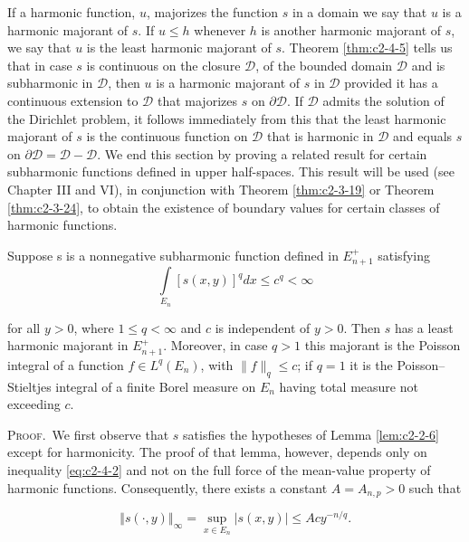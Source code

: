 If a harmonic function, $u$, majorizes the function $s$ in a domain we say that $u$ is a harmonic majorant of $s$. If $u \leq h$ whenever $h$ is another harmonic majorant of $s$, we say that $u$ is the least harmonic majorant of $s$. Theorem \ref{thm:c2-4-5} tells us that in case $s$ is continuous on the closure $\mathcal{D}$, of the bounded domain $\mathcal{D}$ and is subharmonic in $\mathcal{D}$, then $u$ is a harmonic majorant of $s$ in $\mathcal{D}$ provided it has a continuous extension to $\mathcal{D}$ that majorizes $s$ on $\partial\mathcal{D}$. If $\mathcal{D}$ admits the solution of the Dirichlet problem, it follows immediately from this that the least harmonic majorant of $s$ is the continuous function on $\mathcal{D}$ that is harmonic in $\mathcal{D}$ and equals $s$ on $\partial\mathcal{D} = \mathcal{D} - \mathcal{D}$. We end this section by proving a related result for certain subharmonic functions defined in upper half-spaces. This result will be used (see Chapter III and VI), in conjunction with Theorem \ref{thm:c2-3-19} or Theorem \ref{thm:c2-3-24}, to obtain the existence of boundary values for certain classes of harmonic functions.

\begin{theorem}
\label{thm:c2-4-6}
Suppose s is a nonnegative subharmonic function defined in $E_{n+1}^{+}$ satisfying
\begin{equation}\label{eq:c2-4-7}
\int\limits_{E_{n}}[s(x,y)]^{q} dx\leq c^{q}<\infty
\end{equation}

for all $y > 0$, where $1 \leq q < \infty$ and $c$ is independent of $y > 0$. Then $s$ has a least harmonic majorant in $E_{n+1}^{+}$. Moreover, in case $q > 1$ this majorant is the Poisson integral of a function $f \in L^{q}(E_{n})$, with $\|f\|_{q} \leq c$; if $q = 1$ it is the Poisson--Stieltjes integral of a finite Borel measure on $E_{n}$ having total measure not exceeding $c$.
\end{theorem}

\textsc{Proof.}\ We first observe that $s$ satisfies the hypotheses of Lemma \ref{lem:c2-2-6} except for harmonicity. The proof of that lemma, however, depends only on inequality \eqref{eq:c2-4-2} and not on the full force of the mean-value property of harmonic functions. Consequently, there exists a constant $A = A_{n,p} > 0$ such that

\begin{equation}\label{eq:c2-4-8}
\left\Vert s(\cdot,y)\right\Vert_{\infty}=\sup_{x\in E_{n}}\left\vert s(x,y)\right\vert\leq A c y^{-n/q}.
\end{equation}

